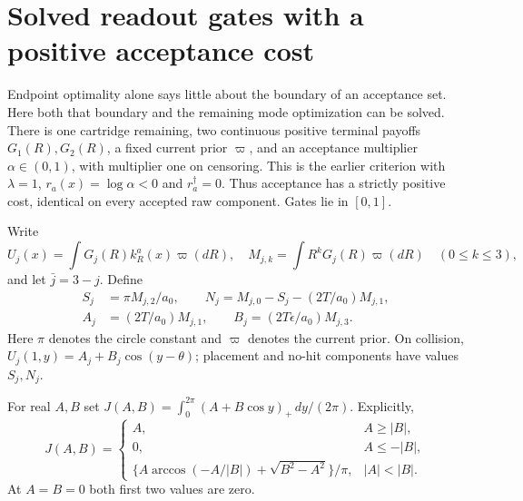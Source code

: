 \section{Solved readout gates with a positive acceptance cost}\label{sec:solved}
Endpoint optimality alone says little about the boundary of an acceptance set. Here both that boundary and the remaining mode optimization can be solved. There is one cartridge remaining, two continuous positive terminal payoffs $G_1(R),G_2(R)$, a fixed current prior $\varpi$, and an acceptance multiplier $\alpha\in(0,1)$, with multiplier one on censoring. This is the earlier criterion with $\lambda=1$, $r_a(x)=\log\alpha<0$ and $r_a^\dagger=0$. Thus acceptance has a strictly positive cost, identical on every accepted raw component. Gates lie in $[0,1]$.

Write
\[
 U_j(x)=\int G_j(R)k_R^a(x)\varpi(dR),\quad
 M_{j,k}=\int R^kG_j(R)\varpi(dR)\quad(0\le k\le3),
\]
and let $\bar j=3-j$. Define
\begin{align*}
 S_j&=\pi M_{j,2}/a_0,\qquad
 N_j=M_{j,0}-S_j-(2T/a_0)M_{j,1},\\
 A_j&=(2T/a_0)M_{j,1},\qquad B_j=(2T\epsilon/a_0)M_{j,3}.
\end{align*}
Here $\pi$ denotes the circle constant and $\varpi$ denotes the current prior. On collision, $U_j(1,y)=A_j+B_j\cos(y-\theta)$; placement and no-hit components have values $S_j,N_j$.

For real $A,B$ set $J(A,B)=\int_0^{2\pi}(A+B\cos y)_+\,dy/(2\pi)$. Explicitly,
\begin{equation}
 J(A,B)=
 \begin{cases}
 A,&A\ge|B|,\\
 0,&A\le-|B|,\\
 \{A\arccos(-A/|B|)+\sqrt{B^2-A^2}\}/\pi,&|A|<|B|.
 \end{cases}
 \label{eq:J}
\end{equation}
At $A=B=0$ both first two values are zero.

